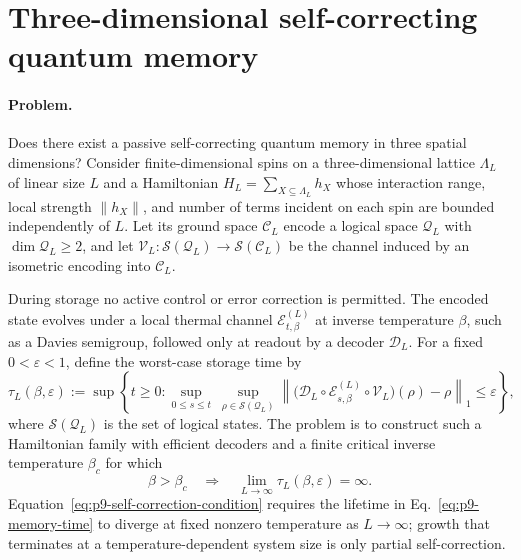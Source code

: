 \section{Three-dimensional self-correcting quantum memory}
\label{sec:problem-9}

\paragraph{Problem.}
Does there exist a passive self-correcting quantum memory in three spatial
dimensions?  Consider finite-dimensional spins on a three-dimensional lattice
$\Lambda_L$ of linear size $L$ and a Hamiltonian
$H_L=\sum_{X\subseteq\Lambda_L}h_X$ whose interaction range, local strength
$\lVert h_X\rVert$, and number of terms incident on each spin are bounded
independently of $L$.  Let its ground space $\mathcal C_L$ encode a logical
space $\mathcal Q_L$ with $\dim\mathcal Q_L\ge2$, and let
$\mathcal V_L:\mathcal S(\mathcal Q_L)\to\mathcal S(\mathcal C_L)$ be the
channel induced by an isometric encoding into $\mathcal C_L$.

During storage no active control or error correction is permitted.  The
encoded state evolves under a local thermal channel
$\mathcal E_{t,\beta}^{(L)}$ at inverse temperature $\beta$, such as a Davies
semigroup, followed only at readout by a decoder $\mathcal D_L$.  For a fixed
$0<\varepsilon<1$, define the worst-case storage time by
\begin{equation}
  \tau_L(\beta,\varepsilon)
  :=\sup\!\left\{t\ge0:
       \sup_{0\le s\le t}\ \sup_{\rho\in\mathcal S(\mathcal Q_L)}
       \left\|
         \bigl(\mathcal D_L\circ\mathcal E_{s,\beta}^{(L)}
         \circ\mathcal V_L\bigr)(\rho)-\rho
       \right\|_1
       \le\varepsilon\right\},
  \label{eq:p9-memory-time}
\end{equation}
where $\mathcal S(\mathcal Q_L)$ is the set of logical states.  The problem is
to construct such a Hamiltonian family with efficient decoders and a finite
critical inverse temperature $\beta_c$ for which
\begin{equation}
  \beta>\beta_c
  \quad\Longrightarrow\quad
  \lim_{L\to\infty}\tau_L(\beta,\varepsilon)=\infty.
  \label{eq:p9-self-correction-condition}
\end{equation}
Equation~\eqref{eq:p9-self-correction-condition} requires the lifetime in
Eq.~\eqref{eq:p9-memory-time} to diverge at fixed nonzero temperature as
$L\to\infty$; growth that terminates at a temperature-dependent system size is
only partial self-correction.

